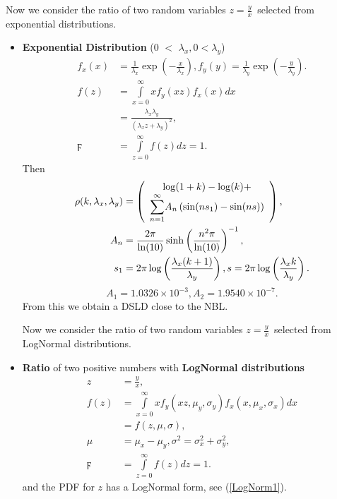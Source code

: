 \documentclass[titlepage,fleqn]{article}%
\begin{document}
Now we consider the ratio of two random variables $z=\frac{y}{x}$\ selected
from exponential distributions.

\begin{itemize}
\item \textbf{Exponential Distribution} ($0$%
$<$%
$\lambda_{x},0<\lambda_{y}$)%
\begin{align*}
f_{x}(x)  &  =\frac{1}{\lambda_{x}}\exp\left(  -\frac{x}{\lambda_{x}}\right)
,f_{y}(y)=\frac{1}{\lambda_{y}}\exp\left(  -\frac{y}{\lambda_{y}}\right)  .\\
f(z)  &  =%
{\displaystyle\int\limits_{x=0}^{\infty}}
xf_{y}(xz)f_{x}(x)dx\\
&  =\frac{\lambda_{x}\lambda_{y}}{\left(  \lambda_{x}z+\lambda_{y}\right)
^{2}},\\
\digamma &  =%
{\displaystyle\int\limits_{z=0}^{\infty}}
f(z)dz=1.
\end{align*}
Then%
\begin{align*}
\rho(k,\lambda_{x},\lambda_{y})  &  =\left(
\begin{array}
[c]{c}%
\log(1+k)-\log(k)+\\%
{\displaystyle\sum\limits_{n=1}^{\infty}}
A_{n}\left(  \sin(ns_{1}\right)  -\sin(ns))
\end{array}
\right)  ,\\
A_{n}  &  =\frac{2\pi}{\ln(10)}\sinh\left(  \frac{n^{2}\pi}{\ln(10)}\right)
^{-1},\\
s_{1}  &  =2\pi\log\left(  \frac{\lambda_{x}(k+1)}{\lambda_{y}}\right)
,s=2\pi\log\left(  \frac{\lambda_{x}k}{\lambda_{y}}\right)  .
\end{align*}%
\[
A_{1}=1.0326\times10^{-3},A_{2}=1.9540\times10^{-7}.
\]
From this we obtain a DSLD close to the NBL.

Now we consider the ratio of two random variables $z=\frac{y}{x}$\ selected
from LogNormal distributions.

\item \textbf{Ratio } of two positive numbers with \textbf{LogNormal
distributions}%
\begin{align*}
z  &  =\frac{y}{x},\\
f(z)  &  =%
{\displaystyle\int\limits_{x=0}^{\infty}}
xf_{y}(xz,\mu_{y},\sigma_{y})f_{x}(x,\mu_{x},\sigma_{x})dx\\
&  =f(z,\mu,\sigma),\\
\mu &  =\mu_{x}-\mu_{y},\sigma^{2}=\sigma_{x}^{2}+\sigma_{y}^{2},\\
\digamma &  =%
{\displaystyle\int\limits_{z=0}^{\infty}}
f(z)dz=1.
\end{align*}
and the PDF for $z$ has a LogNormal form, see (\ref{LogNorm1}).
\end{itemize}
\end{document}

